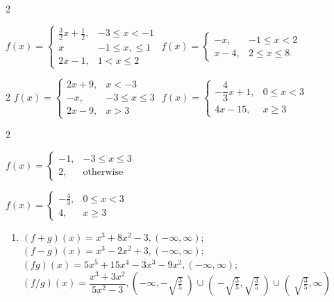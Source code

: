 \documentclass{book}
\begin{document}
\begin{appendices}
\begin{enumerate}[!HW!]
\begin{multicols}{2}
\item $f(x) = \begin{cases} \frac{3}{2}x+\frac{1}{2}, & -3\le x< -1\\ x& -1\le x,\le 1\\ 2x-1, & 1<x\le 2\end{cases}$
\itemspade $f(x) = \begin{cases} -x, & -1\le x< 2\\ x-4, & 2\le x\le 8\end{cases}$
\end{multicols}
\begin{multicols}{2}
\itemspade $f(x) = \begin{cases} 2x+9, & x<-3\\ -x, & -3\le x\le3\\ 2x-9, & x>3\end{cases}$
\itemspade $f(x) = \begin{cases} -\dfrac{4}{3}x+1, & 0\le x <3\\ 4x-15, & x\ge 3\end{cases}$
\end{multicols}
\begin{multicols}{2}
\item $f(x) = \begin{cases} -1,  & -3\le x\le 3\\ 2, & \text{otherwise} \end{cases}$
\item $f(x) = \begin{cases} -\frac{4}{3},& 0\le x<3 \\ 4, & x\ge3\end{cases}$
\end{multicols}
\end{enumerate}
\vspace{-15 pt}
\begin{enumerate}[!HW!]

\item $(f+g)(x)=x^3+8x^2-3, (-\infty,\infty)$;\quad $(f-g)(x) = x^3-2x^2+3, (-\infty,\infty)$;\\ $(fg)(x) = 5x^5+15x^4-3x^3-9x^2, (-\infty,\infty)$;\quad $(f/g)(x) = \dfrac{x^3+3x^2}{5x^2-3}, \left(-\infty, -\sqrt{\frac{3}{5}}\middle)\cup\middle( -\sqrt{\frac{3}{5}},  \sqrt{\frac{3}{5}}\middle)\cup\middle( \sqrt{\frac{3}{5}},\infty\right)$


\end{enumerate}
\end{appendices}
\end{document}
